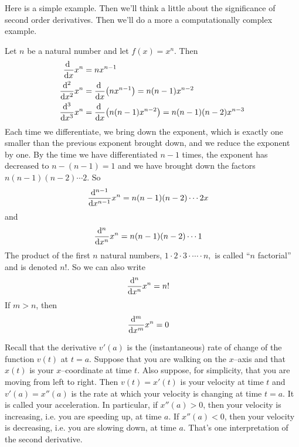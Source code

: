 Here is a simple example. Then we'll think a little about the significance
of second order derivatives. Then we'll do a more a computationally complex
example.

\begin{eg}\label{eg:higherOrdDerivA}
Let $n$ be a natural number and let $f(x)= x^n$. Then
\begin{align*}
\diff{}{x}x^n&=nx^{n-1} \\
\ddiff{2}{}{x}x^n&=\diff{}{x}\big(nx^{n-1}\big)=n(n-1)x^{n-2} \\
\ddiff{3}{}{x}x^n&=\diff{}{x}\big(n(n-1)x^{n-2}\big)=n(n-1)(n-2)x^{n-3}
\end{align*}
Each time we differentiate, we bring down the exponent, which is exactly
one smaller than the previous exponent brought down, and we reduce the
exponent by one. By the time we have differentiated $n-1$ times,
the exponent has decreased to $n-(n-1)=1$ and we have brought down the
factors $n(n-1)(n-2)\cdots 2$. So
\begin{align*}
\frac{\mathrm{d}^{n-1}}{\mathrm{d}{x}^{n-1}}x^n&=n(n-1)(n-2)\cdots 2x
\end{align*}
and
\begin{align*}
\frac{\mathrm{d}^n}{\mathrm{d}{x}^n}x^n&=n(n-1)(n-2)\cdots 1
\end{align*}
The product of the first $n$ natural numbers, $1\cdot 2\cdot 3\cdot \cdots
\cdot n,$ is called ``$n$ factorial'' and is denoted $n!$. So we can also
write
\begin{align*}
\frac{\mathrm{d}^n}{\mathrm{d}{x}^n}x^n&=n!
\end{align*}
If $m>n$, then
\begin{align*}
\frac{\mathrm{d}^m}{\mathrm{d}{x}^m}x^n&=0
\end{align*}
\end{eg}

\begin{eg}
Recall that the derivative $v'(a)$ is the (instantaneous) rate of
change of the function $v(t)$ at $t=a$. Suppose that you are walking on
the $x$--axis and that $x(t)$ is your $x$--coordinate at time $t$.
Also suppose, for simplicity, that you are moving from left to right.
Then $v(t)=x'(t)$ is your velocity at time $t$ and $v'(a)=x''(a)$ is the
rate at which your velocity is changing at time $t=a$. It is called your
acceleration. In particular, if $x''(a)>0$, then your velocity is increasing,
i.e. you are speeding up, at time $a$. If $x''(a)<0$, then your velocity
is decreasing, i.e. you are slowing down, at time $a$. That's one
interpretation of the second derivative.
\end{eg}

